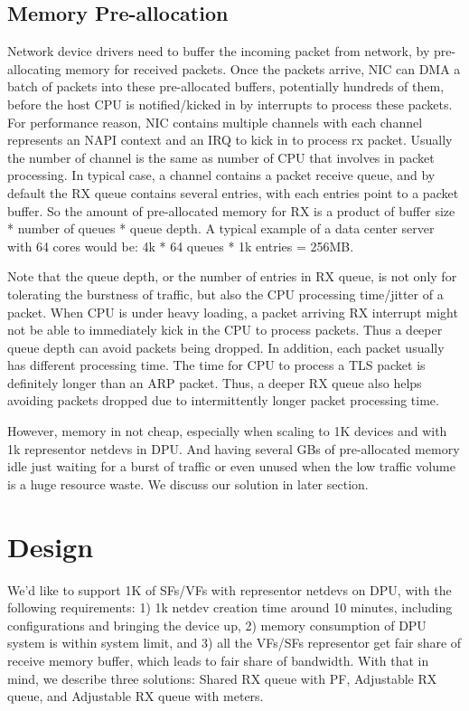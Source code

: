\documentclass[letterpaper]{article}
\begin{document}
\subsection{Memory Pre-allocation}
Network device drivers need to buffer the incoming packet from network,
by pre-allocating memory for received packets. Once the packets arrive,
NIC can DMA a batch of packets into these pre-allocated buffers,
potentially hundreds of them, before the host CPU is notified/kicked in
by interrupts to process these packets.
For performance reason, NIC contains multiple channels with each channel
represents an NAPI context and an IRQ to kick in to process rx packet.
Usually the number of channel is the same as number of CPU that involves
in packet processing.
In typical case, a channel contains a packet receive queue,
and by default the RX queue contains several entries, with each entries
point to a packet buffer. So the amount of pre-allocated memory for RX
is a product of buffer size * number of queues * queue depth.
A typical example of a data center server with 64 cores would be:
4k * 64 queues * 1k entries = 256MB.

Note that the queue depth, or the number of entries in RX queue, is
not only for tolerating the burstness of traffic, but also the CPU
processing time/jitter of a packet. When CPU is under heavy loading,
a packet arriving RX interrupt might not be able to immediately
kick in the CPU to process packets. Thus a deeper queue depth can
avoid packets being dropped.
In addition, each packet usually has different processing time.
The time for CPU to process a TLS packet is definitely longer than
an ARP packet. Thus, a deeper RX queue also helps avoiding packets
dropped due to intermittently longer packet processing time.



However, memory in not cheap, especially when scaling to 1K devices
and with 1k representor netdevs in DPU. And having several GBs of
pre-allocated memory idle just waiting for a burst of traffic
or even unused when the low traffic volume is a huge resource waste.
We discuss our solution in later section.

\section{Design}
We'd like to support 1K of SFs/VFs with representor netdevs
on DPU, with the following requirements: 1) 1k netdev creation time
around 10 minutes, including configurations and bringing the device up,
2) memory consumption of DPU system is within
system limit, and 3) all the VFs/SFs representor get fair share
of receive memory buffer, which leads to fair share of bandwidth.
With that in mind, we describe three solutions: Shared RX queue with PF,
Adjustable RX queue, and Adjustable RX queue with meters. 
\end{document}
